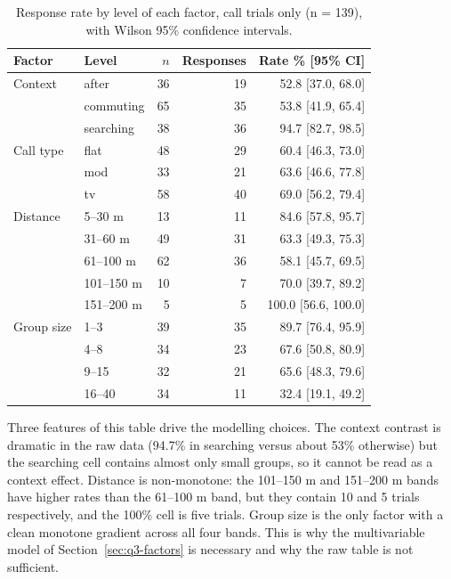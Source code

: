 \begin{table}[htbp]
  \centering
  \caption{Response rate by level of each factor, call trials only (n = 139), with Wilson 95\% confidence intervals.}\label{tab:q3-strata}
  \small
  \begin{tabular}{llrrr}
    \toprule
    Factor & Level & $n$ & Responses & Rate \% [95\% CI] \\
    \midrule
    Context & after & 36 & 19 & 52.8 [37.0, 68.0] \\
            & commuting & 65 & 35 & 53.8 [41.9, 65.4] \\
            & searching & 38 & 36 & 94.7 [82.7, 98.5] \\
    \midrule
    Call type & flat & 48 & 29 & 60.4 [46.3, 73.0] \\
              & mod & 33 & 21 & 63.6 [46.6, 77.8] \\
              & tv & 58 & 40 & 69.0 [56.2, 79.4] \\
    \midrule
    Distance & 5--30 m & 13 & 11 & 84.6 [57.8, 95.7] \\
             & 31--60 m & 49 & 31 & 63.3 [49.3, 75.3] \\
             & 61--100 m & 62 & 36 & 58.1 [45.7, 69.5] \\
             & 101--150 m & 10 & 7 & 70.0 [39.7, 89.2] \\
             & 151--200 m & 5 & 5 & 100.0 [56.6, 100.0] \\
    \midrule
    Group size & 1--3 & 39 & 35 & 89.7 [76.4, 95.9] \\
               & 4--8 & 34 & 23 & 67.6 [50.8, 80.9] \\
               & 9--15 & 32 & 21 & 65.6 [48.3, 79.6] \\
               & 16--40 & 34 & 11 & 32.4 [19.1, 49.2] \\
    \bottomrule
  \end{tabular}
\end{table}

Three features of this table drive the modelling choices. The context contrast is dramatic in
the raw data (94.7\% in searching versus about 53\% otherwise) but the searching cell contains
almost only small groups, so it cannot be read as a context effect. Distance is non-monotone:
the 101--150 m and 151--200 m bands have higher rates than the 61--100 m band, but they contain
10 and 5 trials respectively, and the 100\% cell is five trials. Group size is the only factor
with a clean monotone gradient across all four bands. This is why the multivariable model of
Section~\ref{sec:q3-factors} is necessary and why the raw table is not sufficient.


